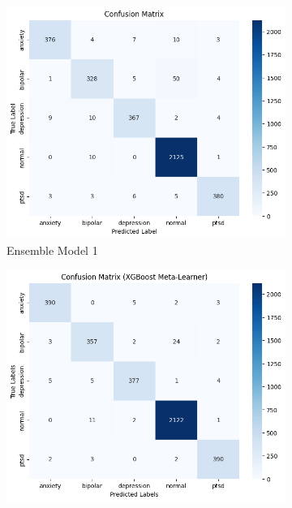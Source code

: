 \begin{figure}[H]
    \centering
    \begin{subfigure}[b]{0.49\textwidth}
        \centering
        \includegraphics[width=\textwidth]{Images/EM CM.png}
        \caption*{Ensemble Model 1}
        \label{dfdl3123}  %
    \end{subfigure}
    \hfill
    \vspace{0.5cm}
    \begin{subfigure}[b]{0.49\textwidth}
        \centering
        \includegraphics[width=\textwidth]{Images/EM2 CM.png}

\end{subfigure}
\end{figure}
